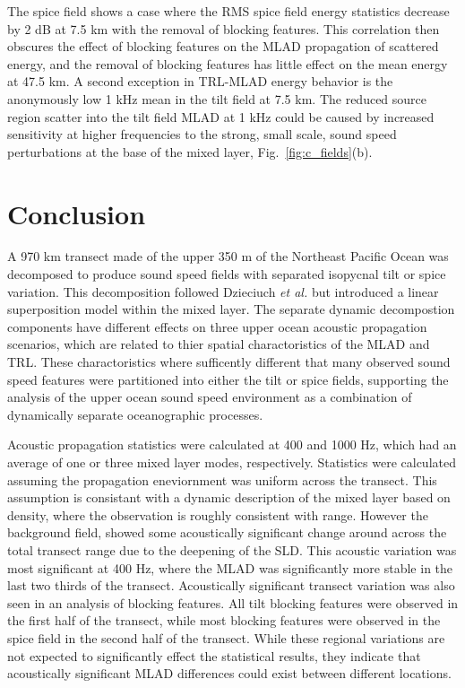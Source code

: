 \documentclass[preprint,NumberedRefs]{JASA}
\begin{document}
The spice field shows a case where the RMS spice field energy statistics decrease by 2 dB at 7.5 km with the removal of blocking features. This correlation then obscures the effect of blocking features on the MLAD propagation of scattered energy, and the removal of blocking features has little effect on the mean energy at 47.5 km. A second exception in TRL-MLAD energy behavior is the anonymously low 1 kHz mean in the tilt field at 7.5 km. The reduced source region scatter into the tilt field MLAD at 1 kHz could be caused by increased sensitivity at higher frequencies to the strong, small scale, sound speed perturbations at the base of the mixed layer, Fig.~\ref{fig:c_fields}(b).

\section{Conclusion}\label{sec:conclusion}
A 970 km transect made of the upper 350 m of the Northeast Pacific Ocean was decomposed to produce sound speed fields with separated isopycnal tilt or spice variation. This decomposition followed Dzieciuch \emph{et al.}\citep{dzieciuch2004} but introduced a linear superposition model within the mixed layer. The separate dynamic decompostion components have different effects on three upper ocean acoustic propagation scenarios, which are related to thier spatial charactoristics of the MLAD and TRL. These charactoristics where sufficently different that many observed sound speed features were partitioned into either the tilt or spice fields, supporting the analysis of the upper ocean sound speed environment as a combination of dynamically separate oceanographic processes.

Acoustic propagation statistics were calculated at 400 and 1000 Hz, which had an average of one or three mixed layer modes, respectively. Statistics were calculated assuming the propagation eneviornment was uniform across the transect. This assumption is consistant with a dynamic description of the mixed layer based on density\citep{cole2010seasonal}, where the observation is roughly consistent with range. However the background field, showed some acoustically significant change around across the total transect range due to the deepening of the SLD. This acoustic variation was most significant at 400 Hz, where the MLAD was significantly more stable in the last two thirds of the transect.  Acoustically significant transect variation was also seen in an analysis of blocking features. All tilt blocking features were observed in the first half of the transect, while most blocking features were observed in the spice field in the second half of the transect. While these regional variations are not expected to significantly effect the statistical results, they indicate that acoustically significant MLAD differences could exist between different locations.
\end{document}
